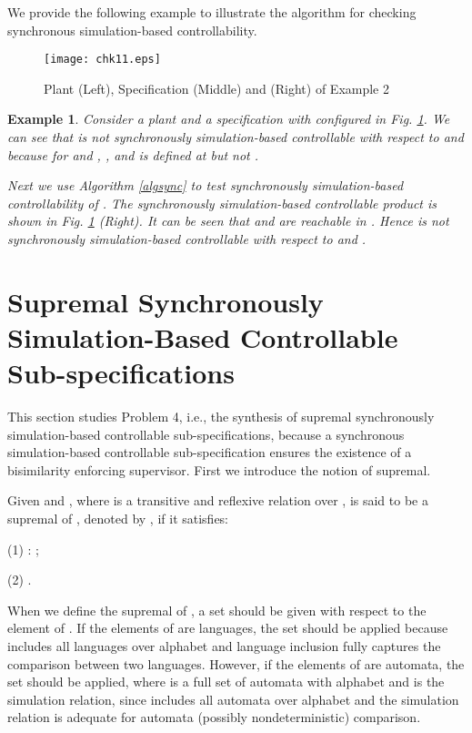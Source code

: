 \documentclass[preprint,authoryear,12pt]{elsarticle}
\newtheorem{Example}{Example}
\begin{document}
We provide the following example to illustrate the algorithm for
checking synchronous simulation-based controllability.

\begin{figure}[!htb]
\begin{center}
\texttt{[image: chk11.eps]}
\caption{ Plant  (Left), Specification  (Middle) and
 (Right) of Example 2} \label{chk1}
\end{center}
\end{figure}


\begin{Example}\label{checksync}
Consider a plant  and a specification  with
 configured in Fig. \ref{chk1}. We can see
that  is not synchronously simulation-based controllable with
respect to  and  because for 
and , , and  is
defined at  but not .

Next we use Algorithm \ref{algsync} to test synchronously
simulation-based controllability of . The synchronously
simulation-based controllable product  is shown in
Fig. \ref{chk1} (Right). It can be seen that  and  are
reachable in . Hence  is not synchronously
simulation-based controllable with respect to  and
.
\end{Example}










\section{Supremal Synchronously Simulation-Based Controllable Sub-specifications}
This section studies Problem 4, i.e., the synthesis of supremal
synchronously simulation-based controllable sub-specifications,
because a synchronous simulation-based controllable
sub-specification ensures the existence of a bisimilarity
enforcing supervisor. First we introduce the notion of supremal.


Given  and , where  is a transitive and reflexive relation over ,  is said to be a supremal of , denoted by , if it
satisfies:

(1) : ;

(2) .

When we define the supremal of , a set  should be
given with respect to the element of . If the elements of 
are languages, the set  should be
applied because  includes all languages over
alphabet  and language inclusion fully captures the
comparison between two languages. However, if the elements of 
are automata, the set  should be applied, where  is
a full set of automata with alphabet  and  is the simulation relation, since  includes all
automata over alphabet  and the simulation relation is
adequate for automata (possibly nondeterministic) comparison.
\end{document}
